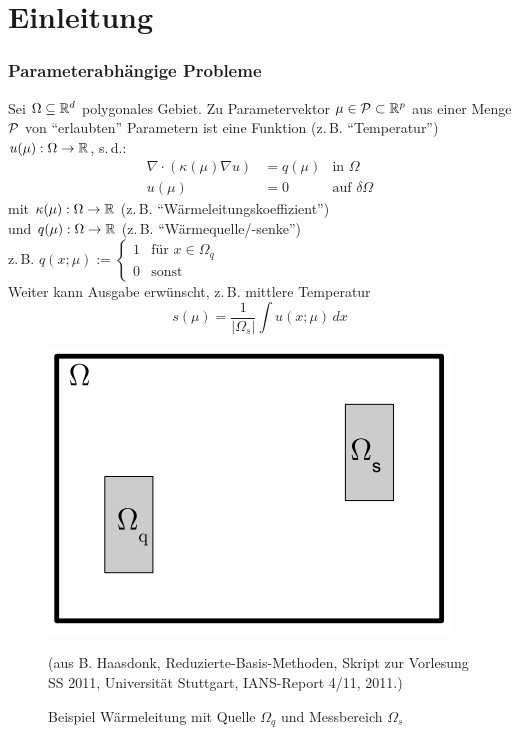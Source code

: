 \section{Einleitung}
\label{sec-1}

\subsubsection*{Parameterabhängige Probleme}
\label{Parameterabhängige Probleme}

\begin{bsp}
	Sei $\Omega \subseteq \mathbb{R}^d$ polygonales Gebiet. Zu Parametervektor $\mu \in \mathcal{P} \subset \mathbb{R}^p$ aus einer Menge $\mathcal{P}$ von "`erlaubten"' Parametern ist eine Funktion (z.\,B. "`Temperatur"') $u(\mu): \Omega \rightarrow \mathbb{R}$, s.\,d.:
	\begin{align*}
		\nabla \cdot (\kappa(\mu) \nabla u) &= q(\mu) & \text{in } \Omega \\
		u(\mu) &= 0 & \text{auf } \delta\Omega
	\end{align*}
	mit $\kappa(\mu) : \Omega \rightarrow \mathbb{R}$ (z.\,B. "`Wärmeleitungskoeffizient"') \\
	und $q(\mu) : \Omega \rightarrow \mathbb{R}$ (z.\,B. "`Wärmequelle/-senke"') \\
	
	z.\,B. $q(x;\mu) := \begin{cases}
			1 & \text{für } x \in \Omega_q \\
			0 & \text{sonst}
		\end{cases}$
\\

Weiter kann Ausgabe erwünscht, z.\,B. mittlere Temperatur
	\[
		s(\mu) = \frac{1}{|\Omega_s|} \int u(x; \mu) \,dx
	\]
	
\begin{figure}[H]
  \centering\small
    \includegraphics[width = 0.5 \textwidth]{Bilder/MittlereTemp.png}
  \caption{Beispiel Wärmeleitung mit Quelle $\Omega_q$ und Messbereich $\Omega_s$}{(aus B. Haasdonk, Reduzierte-Basis-Methoden, Skript zur Vorlesung SS 2011, Universität Stuttgart, IANS-Report 4/11, 2011.)}
  \label{fig:MittlereTemp}
\end{figure}
\end{bsp}

